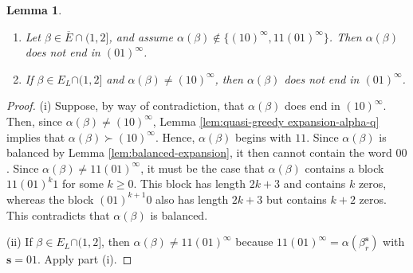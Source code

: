 \documentclass[11pt]{amsart}
\newtheorem{lemma}[theorem]{Lemma}
\theoremstyle{definition}
\theoremstyle{remark}
\newtheorem{remark}[theorem]{Remark}
\numberwithin{equation}{section}
\newcommand{\s}{ {\mathbf{s}}}
\newcommand{\f}{\infty}
\newcommand{\al}{\alpha}
\begin{document}
\begin{lemma} \label{lem:not-0-1-repeated}
\begin{enumerate}[{\rm(i)}]
\item Let $\beta\in \overline{E}\cap(1,2]$, and assume $\al(\beta)\not\in\{(10)^\f,11(01)^\f\}$. Then $\al(\beta)$ does not end in $(01)^\f$. 
\item If $\beta\in E_L{\cap(1,2]}$ and $\al(\beta)\neq (10)^\f$, then $\al(\beta)$ does not end in $(01)^\f$.
\end{enumerate}
\end{lemma}

\begin{proof}
{ (i) Suppose, by way of contradiction, that $\al(\beta)$ does end in $(10)^\f$. Then, since $\al(\beta)\neq (10)^\f$,  Lemma \ref{lem:quasi-greedy expansion-alpha-q} implies that $\al(\beta)\succ (10)^\f$. Hence, $\al(\beta)$ begins with $11$. Since $\al(\beta)$ is balanced by Lemma \ref{lem:balanced-expansion}, it then cannot contain the word $00$. Since $\al(\beta)\neq 11(01)^\f$, it must be the case that $\al(\beta)$ contains a block $11(01)^k1$ for some $k\geq 0$. This block has length $2k+3$ and contains $k$ zeros, whereas the block $(01)^{k+1}0$ also has length $2k+3$ but contains $k+2$ zeros. This contradicts that $\al(\beta)$ is balanced.

(ii) If $\beta\in E_L{\cap(1,2]}$, then $\al(\beta)\neq 11(01)^\f$ because $11(01)^\f=\al(\beta_r^\s)$ with $\s=01$. Apply part (i).}
\end{proof}

\end{document}
